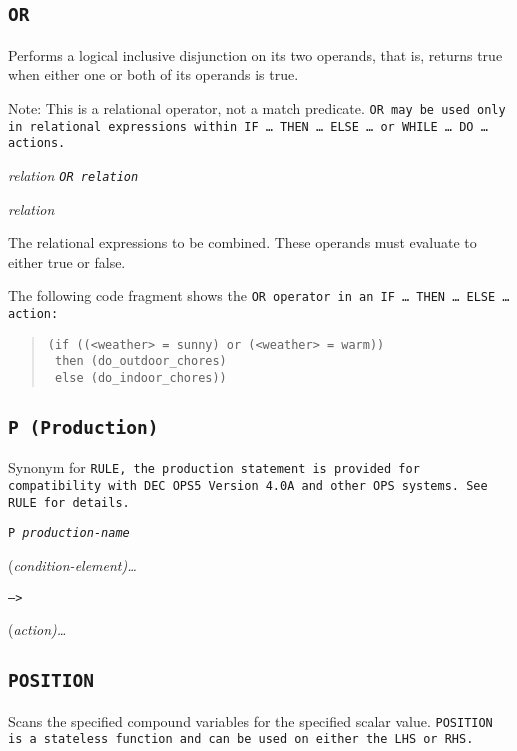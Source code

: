 {{\subsection{\tt{OR}}

Performs a logical inclusive disjunction on its two operands,
that is, returns true when either one or both of its operands
is true.

Note:  This is a relational operator, not a match predicate.
\tt{OR} may be used only in relational expressions within
\tt{IF} {\ldots} \tt{THEN} {\ldots} \tt{ELSE} {\ldots} or \tt{WHILE} {\ldots} \tt{DO} {\ldots} actions.

\Format

\it{relation} \tt{OR} \it{relation}

\Operands

\it{relation}

The relational expressions to be combined. These operands
must evaluate to either true or false.

\Example

The following code fragment shows the \tt{OR} operator in an \tt{IF}
{\ldots} \tt{THEN} {\ldots} \tt{ELSE} {\ldots} action:
\begin{quote}
\begin{verbatim}
(if ((<weather> = sunny) or (<weather> = warm))
 then (do_outdoor_chores)
 else (do_indoor_chores))
\end{verbatim}
\end{quote}

\subsection{\tt{P} (Production)}

Synonym for \tt{RULE}, the production statement is provided for
compatibility with DEC OPS5 Version 4.0A and other OPS
systems. See \tt{RULE} for details.

\Format

\tt{P} \it{production-name} 

\qquad(\it{condition-element})\dots

\qquad\tt{-->}

\qquad(\it{action})\ldots

\subsection{\tt{POSITION}}

Scans the specified compound variables for the specified scalar
value. \tt{POSITION} is a stateless function and can be used on either
the LHS or RHS.

}}
